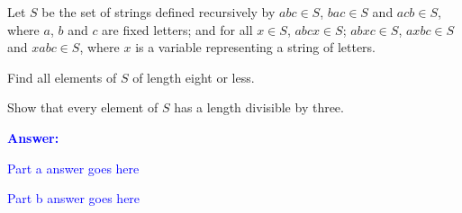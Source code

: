\item{}
Let $S$ be the set of strings defined recursively by $abc \in S$, $bac \in S$
and $acb \in S$, where $a$, $b$ and $c$ are fixed letters; and for all
$x\in S$, $abcx \in S$; $abxc \in S$, $axbc \in S$ and $xabc \in S$, where $x$
is a variable representing a string of letters.
\begin{list}{\textbf{.}}{}
\item Find all elements of $S$ of length eight or less.
\item Show that every element of $S$ has a length divisible by three.
\end{list}
\vskip12pt
\ifanswers
\textcolor{blue}{
\textbf{Answer:}\\[6pt]
\begin{list}{\textbf{.}}{}
\item Part a answer goes here
\item Part b answer goes here
\end{list}
}
\newpage
\fi
